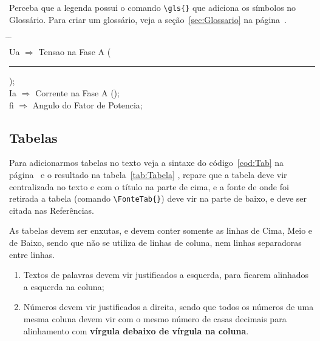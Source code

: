 \begin{CaixaVerde}
    Perceba que a legenda possui o comando \verb|\gls{}| que adiciona os símbolos no Glossário. Para criar um glossário, veja a seção~\ref{sec:Glossario} na página~\pageref{sec:Glossario}.
\end{CaixaVerde}

\pagebreak
\begin{Codigo}[language=tex, 
    caption=Sintaxe para criar a legenda alinhada e com citação no Glossário, 
    label=cod:LegendaGraf]
\begin{tabbing}
  \hspace{1cm}  \=  \hspace{1cm}   \= \kill \\
  \gls{Ua}      \>  $\Rightarrow$  \> Tensao na Fase A
                    (\textcolor{blue}{\rule{3cm}{1mm}}); \\
  \gls{Ia}      \>  $\Rightarrow$  \> Corrente na Fase A
    (\textcolor{red}{\hdashrule[0.1ex]{3.1cm}{1mm}{2mm}}); \\
  \gls{fi}      \>  $\Rightarrow$  \> Angulo do Fator de
                                      Potencia;  \\   
\end{tabbing}
\end{Codigo}


\subsection{Tabelas}

Para adicionarmos tabelas no texto veja a sintaxe do código~\ref{cod:Tab} na página~\pageref{cod:Tab} e o resultado na tabela~\ref{tab:Tabela} ,  repare que a tabela deve vir centralizada no texto e com o título na parte de cima, e a fonte de onde foi retirada a tabela (comando \verb|\FonteTab{}|) deve vir na parte de baixo, e deve ser citada nas Referências. 

As tabelas devem ser enxutas, e devem conter somente as linhas de Cima, Meio e de Baixo, sendo que não se utiliza de linhas de coluna, nem linhas separadoras entre linhas.

\begin{CaixaVermelha}
    \begin{enumerate}
        \item Textos de palavras devem vir justificados a esquerda, para ficarem  alinhados a esquerda na coluna;
        \item Números devem vir justificados a direita, sendo que todos os números de uma mesma coluna devem vir com o mesmo número de casas decimais para alinhamento com {\bf vírgula debaixo de vírgula na coluna}.
    \end{enumerate}
\end{CaixaVermelha}

